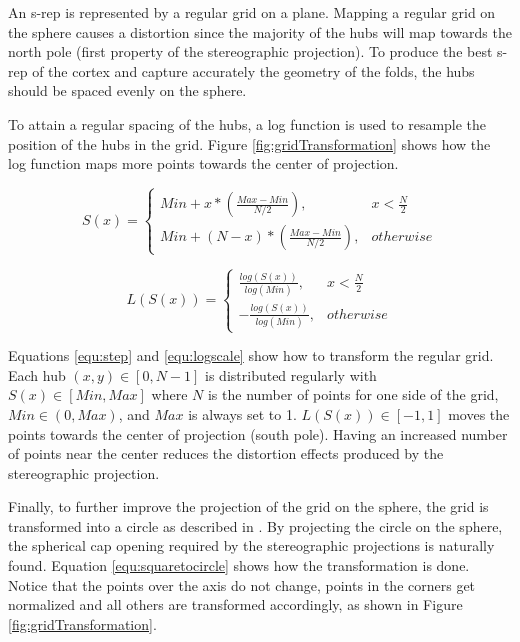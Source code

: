 \documentclass[a4paper,twoside]{article}
\begin{document}
An s-rep is represented by a regular grid on a plane.
Mapping a regular grid on the sphere 
causes a distortion since 
the majority of the hubs will map towards the north pole (first property of the stereographic projection).
To produce the best s-rep of the cortex and capture accurately the geometry of the folds,
the hubs should be spaced evenly on the sphere. 

To attain a regular spacing of the hubs, a log function is used to resample the position of the hubs in the grid. 
Figure \ref{fig:gridTransformation} shows how the log function maps more points towards the center of projection.

\begin{equation}
  S(x) =  \left\{
      \begin{array}{lr}
        Min + x*(\frac{Max - Min}{N/2}), & x < \frac{N}{2} \\
        Min + (N-x)*(\frac{Max - Min}{N/2}), & otherwise
      \end{array}
  \right.  
  \label{equ:step}
\end{equation}

\begin{equation} 
 L(S(x)) = \left\{\begin{array}{lr}
        \frac{log(S(x))}{log(Min)}, & x < \frac{N}{2} \\
        -\frac{log(S(x))}{log(Min)}, & otherwise
      \end{array}
      \right.
  \label{equ:logscale}
\end{equation}

Equations \ref{equ:step} and \ref{equ:logscale} show how to transform the regular grid.
Each hub $(x,y) \in [0, N-1]$ is distributed regularly with $S(x) \in [Min, Max]$
where $N$ is the number of points for one side of the grid,
$Min \in (0, Max)$, and $Max$ is always set to 1.
$L(S(x)) \in [-1, 1]$ moves the points towards the center 
of projection (south pole). Having an increased number of 
points near the center reduces the distortion effects 
produced by the stereographic projection.

Finally, to further improve the projection of the grid on the sphere, 
the grid is transformed
into a circle as described in \cite{nowell_philip_math}.
By projecting the circle on the sphere, the spherical cap opening
required by the stereographic projections is naturally found.
Equation \ref{equ:squaretocircle} shows how the transformation is done. 
Notice that the points over the axis do not change, points in the corners get normalized and all others are 
transformed accordingly, as shown in Figure \ref{fig:gridTransformation}.
\end{document}
